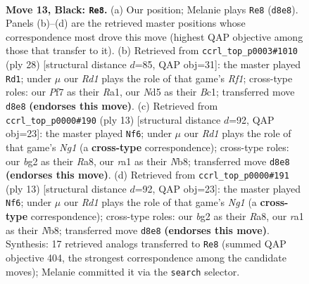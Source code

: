 \documentclass[11pt]{article}
\begin{document}
\clearpage

\begin{figure}[p]\centering
\begin{subfigure}{0.46\textwidth}\centering
\resizebox{\linewidth}{!}{%
\newchessgame
\chessboard[
  setfen={rnbr2k1/ppq1bppp/8/2pn4/P2P3P/5NP1/1P1N1PB1/R1BQ1RK1 b - - 0 13},
  showmover=false,
  pgfstyle=straightmove, color=movearrow, markmove={d8-e8}
]}
\caption{}
\end{subfigure}\hfill
\begin{subfigure}{0.46\textwidth}\centering
\resizebox{\linewidth}{!}{%
\newchessgame
\chessboard[
  setfen={r2qrbk1/pb1n1ppp/2p2n2/1p3N2/4P3/2NB3P/PPQ2PP1/R1B2RK1 w - - 3 15},
  showmover=false,
  pgfstyle=straightmove, color=movearrow, markmove={f1-d1}
]}
\caption{}
\end{subfigure}
\\[4pt]
\begin{subfigure}{0.46\textwidth}\centering
\resizebox{\linewidth}{!}{%
\newchessgame
\chessboard[
  setfen={rnb1kbnr/pp3ppp/3qp3/8/2Bp4/5N2/PPPN1PPP/R1BQ1RK1 b kq - 3 7},
  showmover=false,
  pgfstyle=straightmove, color=movearrow, markmove={g8-f6}
]}
\caption{}
\end{subfigure}\hfill
\begin{subfigure}{0.46\textwidth}\centering
\resizebox{\linewidth}{!}{%
\newchessgame
\chessboard[
  setfen={rnb1kbnr/pp3ppp/3qp3/8/2Bp4/5N2/PPPN1PPP/R1BQ1RK1 b kq - 3 7},
  showmover=false,
  pgfstyle=straightmove, color=movearrow, markmove={g8-f6}
]}
\caption{}
\end{subfigure}
\caption{\textbf{Move 13, Black: \texttt{Re8}.} (a) Our position; Melanie plays \texttt{Re8} (\texttt{d8e8}). Panels (b)--(d) are the retrieved master positions whose correspondence most drove this move (highest QAP objective among those that transfer to it). (b) Retrieved from \texttt{ccrl\_top\_p0003\#1010} (ply 28) [structural distance $d$=85, QAP obj=31]: the master played \texttt{Rd1}; under $\mu$ our \emph{Rd1} plays the role of that game's \emph{Rf1}; cross-type roles: our \emph{P}f7 as their \emph{R}a1, our \emph{N}d5 as their \emph{B}c1; transferred move \texttt{d8e8} \textbf{(endorses this move)}. (c) Retrieved from \texttt{ccrl\_top\_p0000\#190} (ply 13) [structural distance $d$=92, QAP obj=23]: the master played \texttt{Nf6}; under $\mu$ our \emph{Rd1} plays the role of that game's \emph{Ng1} (a \textbf{cross-type} correspondence); cross-type roles: our \emph{b}g2 as their \emph{R}a8, our \emph{r}a1 as their \emph{N}b8; transferred move \texttt{d8e8} \textbf{(endorses this move)}. (d) Retrieved from \texttt{ccrl\_top\_p0000\#191} (ply 13) [structural distance $d$=92, QAP obj=23]: the master played \texttt{Nf6}; under $\mu$ our \emph{Rd1} plays the role of that game's \emph{Ng1} (a \textbf{cross-type} correspondence); cross-type roles: our \emph{b}g2 as their \emph{R}a8, our \emph{r}a1 as their \emph{N}b8; transferred move \texttt{d8e8} \textbf{(endorses this move)}. Synthesis: 17 retrieved analogs transferred to \texttt{Re8} (summed QAP objective 404, the strongest correspondence among the candidate moves); Melanie committed it via the \texttt{search} selector.}
\label{fig:thought-m25}
\end{figure}
\end{document}
